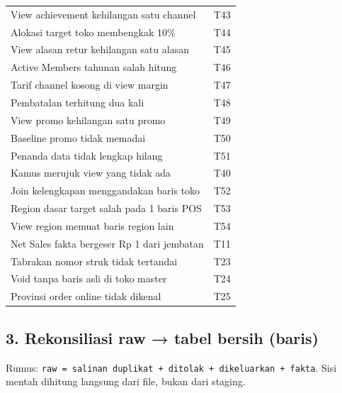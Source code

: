 \documentclass[10pt,a4paper]{article}
\begin{document}
{\begin{longtable}[]{@{}
  >{\raggedright\arraybackslash}p{}
  >{\raggedright\arraybackslash}p{}@{}}
View achievement kehilangan satu channel & T43 \\
Alokasi target toko membengkak 10\% & T44 \\
View alasan retur kehilangan satu alasan & T45 \\
Active Members tahunan salah hitung & T46 \\
Tarif channel kosong di view margin & T47 \\
Pembatalan terhitung dua kali & T48 \\
View promo kehilangan satu promo & T49 \\
Baseline promo tidak memadai & T50 \\
Penanda data tidak lengkap hilang & T51 \\
Kamus merujuk view yang tidak ada & T40 \\
Join kelengkapan menggandakan baris toko & T52 \\
Region dasar target salah pada 1 baris POS & T53 \\
View region memuat baris region lain & T54 \\
Net Sales fakta bergeser Rp 1 dari jembatan & T11 \\
Tabrakan nomor struk tidak tertandai & T23 \\
Void tanpa baris asli di toko master & T24 \\
Provinsi order online tidak dikenal & T25 \\
\end{longtable}
}

\subsection{3. Rekonsiliasi raw → tabel bersih (baris)}\label{rekonsiliasi-raw-tabel-bersih-baris}

Rumus: \texttt{raw\ =\ salinan\ duplikat\ +\ ditolak\ +\ dikeluarkan\ +\ fakta}. Sisi mentah dihitung langsung dari file, bukan dari staging.
\end{document}
